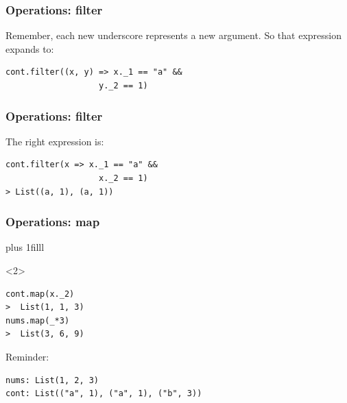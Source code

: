 \documentclass{beamer}
\newcommand{\btVFill}{\vskip0pt plus 1filll}
\begin{document}
\begin{frame}[fragile]
  \frametitle{Operations: filter}
  
Remember, each new underscore represents a new argument. So that expression expands to:

\begin{lstlisting}[language=TeX,basicstyle=\ttfamily\Large]
cont.filter((x, y) => x._1 == "a" &&
                   y._2 == 1) 
\end{lstlisting}
\end{frame}

\begin{frame}[fragile]
  \frametitle{Operations: filter}

The right expression is:

\begin{lstlisting}[basicstyle=\ttfamily\Large,linebackgroundcolor={\btLstHL<1>{1,2}}]
cont.filter(x => x._1 == "a" &&
                   x._2 == 1) 
> List((a, 1), (a, 1))
\end{lstlisting}
\end{frame}



\begin{frame}[fragile]
\frametitle{Operations: map}
  \btVFill
\only<1>{
{\huge\ttfamily map(fn)}
  \btVFill
}

\begin{onlyenv}<2>
\begin{lstlisting}[title=Apply a function to every item in the list,basicstyle=\Large\ttfamily,linebackgroundcolor={\btLstHL<2>{1,3}},basicstyle=\ttfamily\Large]
cont.map(x._2) 
>  List(1, 1, 3)
nums.map(_*3) 
>  List(3, 6, 9)
\end{lstlisting}
\end{onlyenv}

Reminder:
\begin{lstlisting}[numbers=none,linebackgroundcolor={\color{lightyellow}}]
nums: List(1, 2, 3)
cont: List(("a", 1), ("a", 1), ("b", 3))
\end{lstlisting}

\end{frame}


\end{document}
